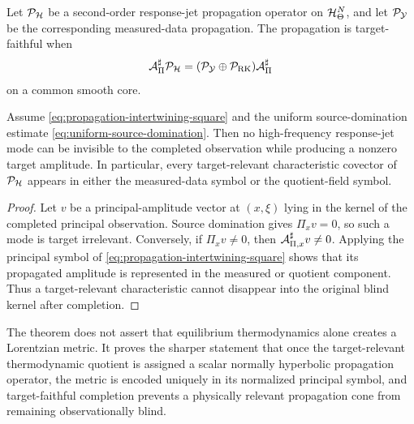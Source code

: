 \begin{definition}
Let $\mathcal P_{\mathcal H}$ be a second-order response-jet propagation operator on $\mathcal H^N_\Theta$, and let $\mathcal P_{\mathcal Y}$ be the corresponding measured-data propagation.  The propagation is target-faithful when
\begin{equation}
\mathcal A_\Pi^\sharp\mathcal P_{\mathcal H}
=
(\mathcal P_{\mathcal Y}\oplus\mathcal P_{\mathrm{RK}})
\mathcal A_\Pi^\sharp
\label{eq:propagation-intertwining-square}
\end{equation}
on a common smooth core.
\end{definition}

\begin{proposition}
\label{prop:no-hidden-target-cone}
Assume \eqref{eq:propagation-intertwining-square} and the uniform source-domination estimate \eqref{eq:uniform-source-domination}.  Then no high-frequency response-jet mode can be invisible to the completed observation while producing a nonzero target amplitude.  In particular, every target-relevant characteristic covector of $\mathcal P_{\mathcal H}$ appears in either the measured-data symbol or the quotient-field symbol.
\end{proposition}

\begin{proof}
Let $v$ be a principal-amplitude vector at $(x,\xi)$ lying in the kernel of the completed principal observation.  Source domination gives $\Pi_xv=0$, so such a mode is target irrelevant.  Conversely, if $\Pi_xv\ne0$, then $\mathcal A_{\Pi,x}^\sharp v\ne0$.  Applying the principal symbol of \eqref{eq:propagation-intertwining-square} shows that its propagated amplitude is represented in the measured or quotient component.  Thus a target-relevant characteristic cannot disappear into the original blind kernel after completion.
\end{proof}

\begin{remark}
The theorem does not assert that equilibrium thermodynamics alone creates a Lorentzian metric.  It proves the sharper statement that once the target-relevant thermodynamic quotient is assigned a scalar normally hyperbolic propagation operator, the metric is encoded uniquely in its normalized principal symbol, and target-faithful completion prevents a physically relevant propagation cone from remaining observationally blind.
\end{remark}
